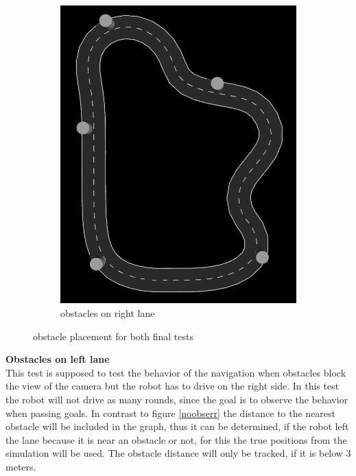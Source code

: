 \begin{figure}[H]
\begin{subfigure}{.5\linewidth}
		\includegraphics[width=\textwidth]{Pictures/right final obs}
		\caption{obstacles on right lane}
	\end{subfigure}

	\caption{obstacle placement for both final tests}
	\label{obstaclefinaltest}

\end{figure}
\textbf{Obstacles on left lane}\\
This test is supposed to test the behavior of the navigation when obstacles block the view of the camera but the robot has to drive on the right side. In this test the robot will not drive as many rounds, since the goal is to observe the behavior when passing goals. In contrast to figure \ref{noobserr} the distance to the nearest obstacle will be included in the graph, thus it can be determined, if the robot left the lane because it is near an obstacle or not, for this the true positions from the simulation will be used. The obstacle distance will only be tracked, if it is below 3 meters.
